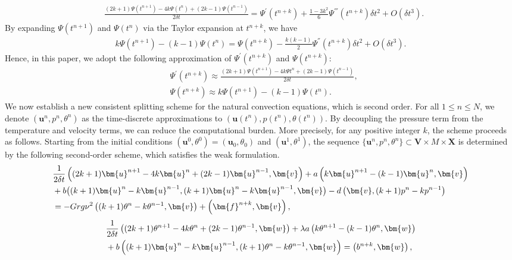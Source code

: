 \documentclass[10pt]{article}
\begin{document}
	\begin{align}
		&\frac{(2k+1)\varPsi(t^{n+1})-4k\varPsi(t^n)+(2k-1)\varPsi(t^{n-1})}{2\delta t}=\varPsi^{'}(t^{n+k})+\frac{1-3k^2}{6}\varPsi^{'''}(t^{n+k})\delta t^2+O(\delta t^3).
	\end{align}
	By expanding $\varPsi(t^{n+1})$ and $\varPsi(t^n)$ via the Taylor expansion at $t^{n+k}$, we have
	\begin{align}
		k\varPsi(t^{n+1})-(k-1)\varPsi(t^n)=\varPsi(t^{n+k})-\frac{k(k-1)}{2}\varPsi^{''}(t^{n+k})\delta t^2+O(\delta t^3).
	\end{align}
	Hence, in this paper, we adopt the following approximation of $\varPsi^{'}(t^{n+k})$ and $\varPsi(t^{n+k})$:
	\begin{align}
		&\varPsi^{'}(t^{n+k})\approx\frac{(2k+1)\varPsi(t^{n+1})-4k\varPsi{t}^n+(2k-1)\varPsi(t^{n-1})}{2\delta t},\\
		&\varPsi(t^{n+k})\approx k\varPsi(t^{n+1})-(k-1)\varPsi(t^n).
	\end{align}
	We now establish a new consistent splitting scheme for the natural convection equations, which is second order. For all \( 1 \leq n \leq N \), we denote \( (\bm{u}^n, p^n, \theta^n) \) as the time-discrete approximations to \( (\bm{u}(t^n), p(t^n), \theta(t^n)) \). By decoupling the pressure term from the temperature and velocity terms, we can reduce the computational burden. More precisely, for any positive integer \( k \), the scheme proceeds as follows. Starting from the initial conditions \( (\bm{u}^0, \theta^0) = (\bm{u}_0, \theta_0) \) and \( (\bm{u}^1, \theta^1) \), the sequence \( \{\bm{u}^n, p^n, \theta^n\} \subset \bm{V} \times M \times \bm{X} \) is determined by the following second-order scheme, which satisfies the weak formulation.
	\begin{align}\label{3.5}
		& \frac{1}{2\delta t}\left( (2k+1)\bm{u}^{n+1} - 4k\bm{u}^{n} + (2k-1)\bm{u}^{n-1}, \bm{v} \right) + a\left(k\bm{u}^{n+1} - (k-1)\bm{u}^n, \bm{v}\right)\notag\\
		&  +b\big((k+1)\bm{u}^n - k\bm{u}^{n-1},{ (k+1)\bm{u}^n - k\bm{u}^{n-1}},\bm{v}\big) - d\left(\bm{v}, (k+1)p^n - kp^{n-1}\right)\notag\\
		&  = -Grg\nu^2\left( (k+1)\theta^n - k\theta^{n-1}, \bm{v} \right)+ \left( \bm{f}^{n+k}, \bm{v} \right),
	\end{align}
	\begin{align}\label{3.6}
		& \frac{1}{2\delta t}\left( (2k+1)\theta^{n+1} - 4k\theta^{n} + (2k-1)\theta^{n-1}, \bm{w} \right) + \lambda a\left(k\theta^{n+1} - (k-1)\theta^n, \bm{w}\right)\notag\\
		&   + b\left((k+1)\bm{u}^n - k\bm{u}^{n-1}, { (k+1)\theta^{n} - k\theta^{n-1}}, \bm{w}\right) = \left(b^{n+k}, \bm{w} \right),
	\end{align}
\end{document}
